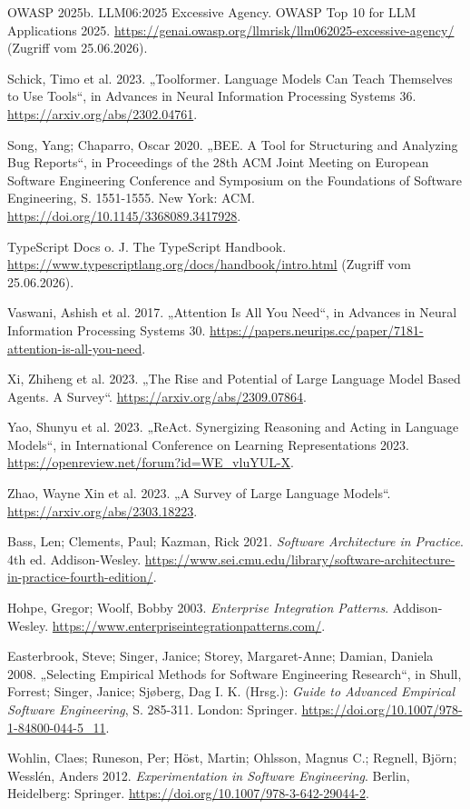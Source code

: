 \documentclass[12pt,a4paper,oneside]{scrreprt}
\begin{document}
OWASP 2025b. LLM06:2025 Excessive Agency. OWASP Top 10 for LLM Applications 2025. \url{https://genai.owasp.org/llmrisk/llm062025-excessive-agency/} (Zugriff vom 25.06.2026).

Schick, Timo et al. 2023. „Toolformer. Language Models Can Teach Themselves to Use Tools“, in Advances in Neural Information Processing Systems 36. \url{https://arxiv.org/abs/2302.04761}.

Song, Yang; Chaparro, Oscar 2020. „BEE. A Tool for Structuring and Analyzing Bug Reports“, in Proceedings of the 28th ACM Joint Meeting on European Software Engineering Conference and Symposium on the Foundations of Software Engineering, S. 1551-1555. New York: ACM. \url{https://doi.org/10.1145/3368089.3417928}.

TypeScript Docs o. J. The TypeScript Handbook. \url{https://www.typescriptlang.org/docs/handbook/intro.html} (Zugriff vom 25.06.2026).

Vaswani, Ashish et al. 2017. „Attention Is All You Need“, in Advances in Neural Information Processing Systems 30. \url{https://papers.neurips.cc/paper/7181-attention-is-all-you-need}.

Xi, Zhiheng et al. 2023. „The Rise and Potential of Large Language Model Based Agents. A Survey“. \url{https://arxiv.org/abs/2309.07864}.

Yao, Shunyu et al. 2023. „ReAct. Synergizing Reasoning and Acting in Language Models“, in International Conference on Learning Representations 2023. \url{https://openreview.net/forum?id=WE_vluYUL-X}.

Zhao, Wayne Xin et al. 2023. „A Survey of Large Language Models“. \url{https://arxiv.org/abs/2303.18223}.

Bass, Len; Clements, Paul; Kazman, Rick 2021. \emph{Software Architecture in Practice}. 4th ed. Addison-Wesley. \url{https://www.sei.cmu.edu/library/software-architecture-in-practice-fourth-edition/}.

Hohpe, Gregor; Woolf, Bobby 2003. \emph{Enterprise Integration Patterns}. Addison-Wesley. \url{https://www.enterpriseintegrationpatterns.com/}.

Easterbrook, Steve; Singer, Janice; Storey, Margaret-Anne; Damian, Daniela 2008. „Selecting Empirical Methods for Software Engineering Research“, in Shull, Forrest; Singer, Janice; Sjøberg, Dag I. K. (Hrsg.): \emph{Guide to Advanced Empirical Software Engineering}, S. 285-311. London: Springer. \url{https://doi.org/10.1007/978-1-84800-044-5_11}.

Wohlin, Claes; Runeson, Per; Höst, Martin; Ohlsson, Magnus C.; Regnell, Björn; Wesslén, Anders 2012. \emph{Experimentation in Software Engineering}. Berlin, Heidelberg: Springer. \url{https://doi.org/10.1007/978-3-642-29044-2}.
\end{document}
